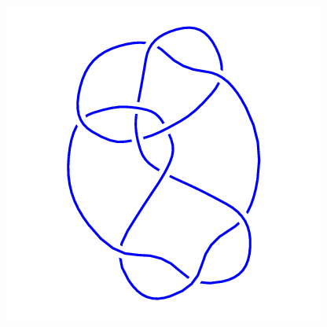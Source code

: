 \begin{figure}[H]
\begin{minipage}[b]{.18\linewidth}
	\end{minipage}
	\begin{minipage}[b]{.18\linewidth}
		\centering
		\includegraphics[width=\linewidth]{../data/10_86.png}
	\end{minipage}
\end{figure}
